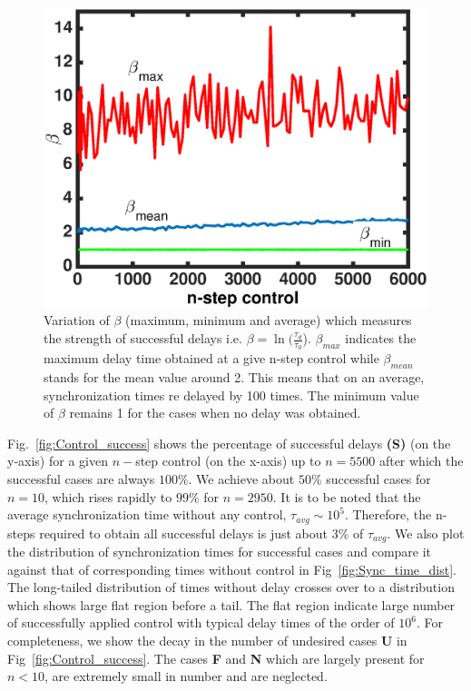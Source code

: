 \documentclass[reprint,amsmath,amssymb,aps,pre]{revtex4-1}
\begin{document}
\begin{figure}[b]
    \includegraphics[scale=0.42]{Strength_con.eps}
    \caption{\label{fig:Strength_con}\footnotesize Variation of $\beta$ 
        (maximum, minimum and average) which measures the strength of 
        successful 
        delays i.e. $\beta = \ln(\frac{\tau_d}{\tau_0}$). $\beta_{max}$ 
        indicates the maximum delay time obtained at a give n-step control 
        while $\beta_{mean}$ stands for the mean value around 2. This means 
        that on an average, synchronization times re delayed by 100 times. The 
        minimum value of $\beta$ remains 1 for the cases when no delay was 
        obtained. }
\end{figure}

Fig.~\ref{fig:Control_success} shows the percentage of successful delays 
\textbf{(S)} (on the y-axis) for a given $n-$step control (on the x-axis) up 
to $n = 5500$ after which the successful cases are always $100\%$.  We achieve 
about $50\%$ successful cases for $n = 10$, which rises rapidly to $99\%$ for 
$n = 2950$. It is to be noted that the average synchronization time without 
any control, $\tau_{avg} \sim 10^5$. Therefore, the n-steps required to obtain 
all successful delays is just about $3\%$ of $\tau_{avg}$. We also plot the 
distribution of synchronization times for successful cases and compare it 
against that of corresponding times without control in 
Fig~\ref{fig:Sync_time_dist}. The long-tailed 
distribution of times without delay crosses over to a distribution which shows 
large flat region before a tail. The flat region indicate large number of 
successfully applied control with typical delay times of the order of $10^6$. 
For completeness, we show the decay in the number of undesired cases 
\textbf{U} in Fig~\ref{fig:Control_success}.  The cases \textbf{F} and 
\textbf{N} which are largely present for $n<10$, are extremely small in number 
and are neglected.
\end{document}
